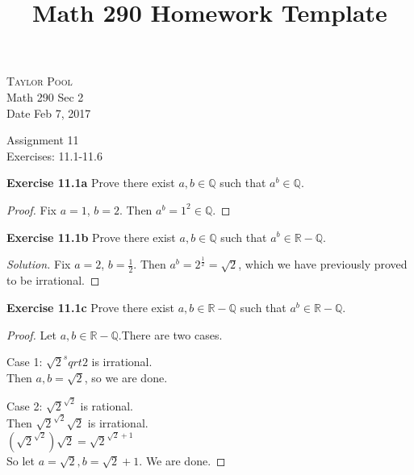 \documentclass[12pt,oneside]{article}
\newenvironment{exercise}[1]{\vspace{.1in}\noindent\textbf{Exercise #1 \hspace{.05em}}}{}
\newcommand{\R}{\mathbb{R}}
\newcommand{\Q}{\mathbb{Q}}
\begin{document}
\title{Math 290 Homework Template}

\begin{flushright}
\textsc{Taylor Pool}  \\
Math 290 Sec 2\\
Date Feb 7, 2017
\end{flushright}

\begin{center}
\textsf{Assignment 11} \\
\textsf{Exercises: 11.1-11.6}
\end{center}


\begin{exercise}{11.1a}
Prove there exist $a,b \in \Q$ such that $a^b \in \Q$.
\end{exercise}

\begin{proof}
Fix $a=1$, $b=2$. Then $a^b=1^2 \in \Q$.
\end{proof}



\begin{exercise}{11.1b}
Prove there exist $a,b \in \Q$ such that $a^b \in \R - \Q$.
\end{exercise}

\begin{proof}[Solution]
Fix $a=2$, $b= \frac{1}{2}$. Then $a^b=2^\frac{1}{2}=\sqrt{2}$, which we have previously proved to be irrational.
\end{proof}



\begin{exercise}{11.1c}
Prove there exist $a,b \in \R - \Q$ such that $a^b \in \R - \Q$.
\end{exercise}

\begin{proof}
Let $a,b \in \R-\Q$.There are two cases.

Case 1: $\sqrt{2}^sqrt{2}$ is irrational.\\
Then $a,b=\sqrt{2}$, so we are done.

Case 2: $\sqrt{2}^{\sqrt{2}}$ is rational.\\
Then $\sqrt{2}^{\sqrt{2}}\sqrt{2}$ is irrational.\\
$(\sqrt{2}^{\sqrt{2}})\sqrt{2}=\sqrt{2}^{\sqrt{2}+1}$\\
So let $a=\sqrt{2}, b=\sqrt{2}+1$. We are done.
\end{proof}
\end{document}
